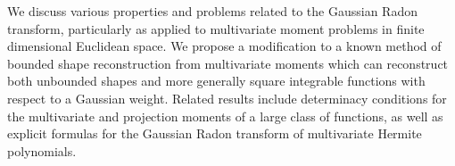 


















\begin{abstractpage}
We discuss various properties and problems related to the Gaussian Radon transform, particularly as applied to multivariate moment problems in finite dimensional Euclidean space. We propose a modification to a known method of bounded shape reconstruction from multivariate moments which can reconstruct both unbounded shapes and more generally square integrable functions with respect to a Gaussian weight. Related results include determinacy conditions for the multivariate and projection moments of a large class of functions, as well as explicit formulas for the Gaussian Radon transform of multivariate Hermite polynomials.
\end{abstractpage}

